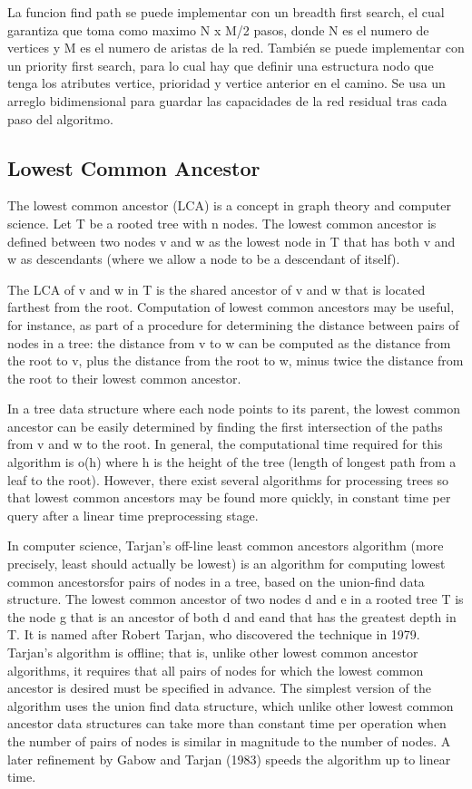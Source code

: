 \documentclass[10pt,letterpaper,twocolumn,twosided]{article}
\newcommand{\codigofuente}[1]{

\dotfill
}
\begin{document}
La funcion find path se puede implementar con un breadth first search, el cual garantiza que toma como maximo N x M/2 pasos, donde N es el numero de vertices y M es el numero de aristas de la red. También se puede implementar con un priority first search, para lo cual hay que definir una estructura nodo que tenga los atributes vertice, prioridad y vertice anterior en el camino. Se usa un arreglo bidimensional para guardar las capacidades de la red residual tras cada paso del algoritmo.

\codigofuente{src/graphs/maxflow.cpp}

\subsection{Lowest Common Ancestor}

The lowest common ancestor (LCA) is a concept in graph theory and computer science. Let T be a rooted tree with n nodes. The lowest common ancestor is defined between two nodes v and w as the lowest node in T that has both v and w as descendants (where we allow a node to be a descendant of itself).

The LCA of v and w in T is the shared ancestor of v and w that is located farthest from the root. Computation of lowest common ancestors may be useful, for instance, as part of a procedure for determining the distance between pairs of nodes in a tree: the distance from v to w can be computed as the distance from the root to v, plus the distance from the root to w, minus twice the distance from the root to their lowest common ancestor.

In a tree data structure where each node points to its parent, the lowest common ancestor can be easily determined by finding the first intersection of the paths from v and w to the root. In general, the computational time required for this algorithm is o(h) where h is the height of the tree (length of longest path from a leaf to the root). However, there exist several algorithms for processing trees so that lowest common ancestors may be found more quickly, in constant time per query after a linear time preprocessing stage.

In computer science, Tarjan's off-line least common ancestors algorithm (more precisely, least should actually be lowest) is an algorithm for computing lowest common ancestorsfor pairs of nodes in a tree, based on the union-find data structure. The lowest common ancestor of two nodes d and e in a rooted tree T is the node g that is an ancestor of both d and eand that has the greatest depth in T. It is named after Robert Tarjan, who discovered the technique in 1979. Tarjan's algorithm is offline; that is, unlike other lowest common ancestor algorithms, it requires that all pairs of nodes for which the lowest common ancestor is desired must be specified in advance. The simplest version of the algorithm uses the union find data structure, which unlike other lowest common ancestor data structures can take more than constant time per operation when the number of pairs of nodes is similar in magnitude to the number of nodes. A later refinement by Gabow and Tarjan (1983) speeds the algorithm up to linear time.
\end{document}
